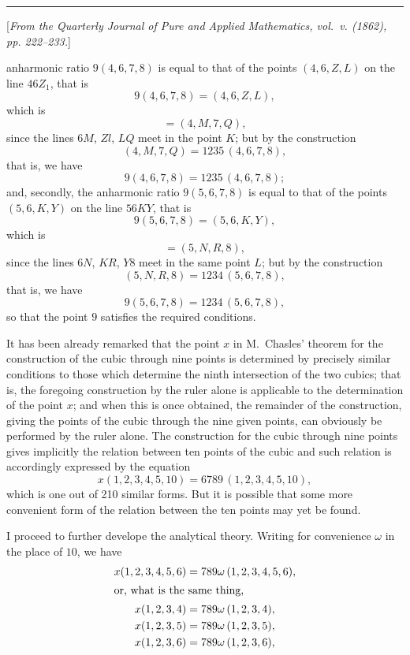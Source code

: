 \documentclass[11pt,a4paper]{book}
\begin{document}
\vspace{1em}
\hrule
\vspace{1.5em}


{\small
[\textit{From the Quarterly Journal of Pure and Applied Mathematics, vol.~v. (1862), pp. 222--233.}]
\par}
\vspace{0.5em}

\setcounter{page}{501}

anharmonic ratio $9(4, 6, 7, 8)$ is equal to that of the points $(4, 6, Z, L)$ on the line $46Z_1$, that is
\[
9 (4, 6, 7, 8) = (4, 6, Z, L),
\]
which is
\[
= (4, M, 7, Q),
\]
since the lines $6M$, $Zl$, $LQ$ meet in the point $K$; but by the construction
\[
(4, M, 7, Q) = 1235\,(4, 6, 7, 8),
\]
that is, we have
\[
9 (4, 6, 7, 8) = 1235\,(4, 6, 7, 8);
\]
and, secondly, the anharmonic ratio $9(5, 6, 7, 8)$ is equal to that of the points $(5, 6, K, Y)$ on the line $56KY$, that is
\[
9(5, 6, 7, 8) = (5, 6, K, Y),
\]
which is
\[
= (5, N, R, 8),
\]
since the lines $6N$, $KR$, $Y8$ meet in the same point $L$; but by the construction
\[
(5, N, R, 8) = 1234\,(5, 6, 7, 8),
\]
that is, we have
\[
9(5, 6, 7, 8) = 1234\,(5, 6, 7, 8),
\]
so that the point $9$ satisfies the required conditions.

It has been already remarked that the point $x$ in M.~Chasles' theorem for the construction of the cubic through nine points is determined by precisely similar conditions to those which determine the ninth intersection of the two cubics; that is, the foregoing construction by the ruler alone is applicable to the determination of the point $x$; and when this is once obtained, the remainder of the construction, giving the points of the cubic through the nine given points, can obviously be performed by the ruler alone. The construction for the cubic through nine points gives implicitly the relation between ten points of the cubic and such relation is accordingly expressed by the equation
\[
x(1, 2, 3, 4, 5, 10) = 6789\,(1, 2, 3, 4, 5, 10),
\]
which is one out of 210 similar forms. But it is possible that some more convenient form of the relation between the ten points may yet be found.

I proceed to further develope the analytical theory. Writing for convenience $\omega$ in the place of $10$, we have
\begin{align*}
x(1, 2, 3, 4, 5, 6) &= 789\omega\,(1, 2, 3, 4, 5, 6),\\
\shortintertext{or, what is the same thing,}
x(1, 2, 3, 4) &= 789\omega\,(1, 2, 3, 4),\\
x(1, 2, 3, 5) &= 789\omega\,(1, 2, 3, 5),\\
x(1, 2, 3, 6) &= 789\omega\,(1, 2, 3, 6),
\end{align*}
\end{document}
